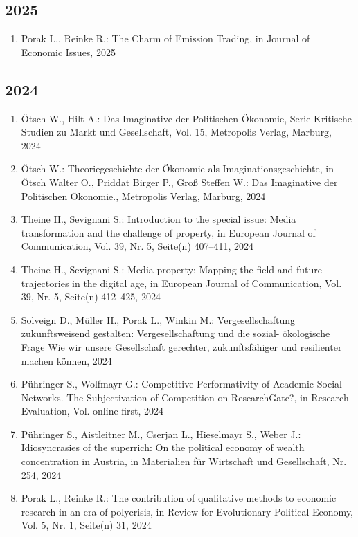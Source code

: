 \subsection*{2025}
\begin{enumerate}
    	 \item Porak L., Reinke R.: The Charm of Emission Trading, in Journal of Economic Issues, 2025
\end{enumerate}
\subsection*{2024}
\begin{enumerate}
    	 \item Ötsch W., Hilt A.: Das Imaginative der Politischen Ökonomie, Serie Kritische Studien zu Markt und Gesellschaft, Vol. 15, Metropolis Verlag, Marburg, 2024
	 \item Ötsch W.: Theoriegeschichte der Ökonomie als Imaginationsgeschichte, in Ötsch Walter O., Priddat Birger P., Groß Steffen W.: Das Imaginative der Politischen Ökonomie., Metropolis Verlag, Marburg, 2024
	 \item Theine H., Sevignani S.: Introduction to the special issue: Media transformation and the challenge of property, in European Journal of Communication, Vol. 39, Nr. 5, Seite(n) 407–411, 2024
	 \item Theine H., Sevignani S.: Media property: Mapping the field and future trajectories in the digital age, in European Journal of Communication, Vol. 39, Nr. 5, Seite(n) 412–425, 2024
	 \item Solveign D., Müller H., Porak L., Winkin M.: Vergesellschaftung zukunftsweisend gestalten: Vergesellschaftung und die sozial- ökologische Frage Wie wir unsere Gesellschaft gerechter, zukunftsfähiger und resilienter machen können, 2024
	 \item Pühringer S., Wolfmayr G.: Competitive Performativity of Academic Social Networks. The Subjectivation of Competition on ResearchGate?, in Research Evaluation, Vol. online first, 2024
	 \item Pühringer S., Aistleitner M., Cserjan L., Hieselmayr S., Weber J.: Idiosyncrasies of the superrich: On the political economy of wealth concentration in Austria, in Materialien für Wirtschaft und Gesellschaft, Nr. 254, 2024
	 \item Porak L., Reinke R.: The contribution of qualitative methods to economic research in an era of polycrisis, in Review for Evolutionary Political Economy, Vol. 5, Nr. 1, Seite(n) 31, 2024

\end{enumerate}
